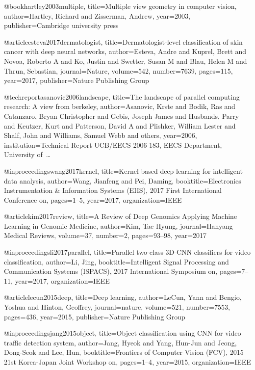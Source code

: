 @book{hartley2003multiple,
  title={Multiple view geometry in computer vision},
  author={Hartley, Richard and Zisserman, Andrew},
  year={2003},
  publisher={Cambridge university press}
}

@article{esteva2017dermatologist,
  title={Dermatologist-level classification of skin cancer with deep neural networks},
  author={Esteva, Andre and Kuprel, Brett and Novoa, Roberto A and Ko, Justin and Swetter, Susan M and Blau, Helen M and Thrun, Sebastian},
  journal={Nature},
  volume={542},
  number={7639},
  pages={115},
  year={2017},
  publisher={Nature Publishing Group}
}

@techreport{asanovic2006landscape,
  title={The landscape of parallel computing research: A view from berkeley},
  author={Asanovic, Krste and Bodik, Ras and Catanzaro, Bryan Christopher and Gebis, Joseph James and Husbands, Parry and Keutzer, Kurt and Patterson, David A and Plishker, William Lester and Shalf, John and Williams, Samuel Webb and others},
  year={2006},
  institution={Technical Report UCB/EECS-2006-183, EECS Department, University of~…}
}

@inproceedings{wang2017kernel,
  title={Kernel-based deep learning for intelligent data analysis},
  author={Wang, Jianfeng and Pei, Daming},
  booktitle={Electronics Instrumentation \& Information Systems (EIIS), 2017 First International Conference on},
  pages={1--5},
  year={2017},
  organization={IEEE}
}

@article{kim2017review,
  title={A Review of Deep Genomics Applying Machine Learning in Genomic Medicine},
  author={Kim, Tae Hyung},
  journal={Hanyang Medical Reviews},
  volume={37},
  number={2},
  pages={93--98},
  year={2017}
}

@inproceedings{li2017parallel,
  title={Parallel two-class 3D-CNN classifiers for video classification},
  author={Li, Jing},
  booktitle={Intelligent Signal Processing and Communication Systems (ISPACS), 2017 International Symposium on},
  pages={7--11},
  year={2017},
  organization={IEEE}
}

@article{lecun2015deep,
  title={Deep learning},
  author={LeCun, Yann and Bengio, Yoshua and Hinton, Geoffrey},
  journal={nature},
  volume={521},
  number={7553},
  pages={436},
  year={2015},
  publisher={Nature Publishing Group}
}

@inproceedings{jang2015object,
  title={Object classification using CNN for video traffic detection system},
  author={Jang, Hyeok and Yang, Hun-Jun and Jeong, Dong-Seok and Lee, Hun},
  booktitle={Frontiers of Computer Vision (FCV), 2015 21st Korea-Japan Joint Workshop on},
  pages={1--4},
  year={2015},
  organization={IEEE}
}


